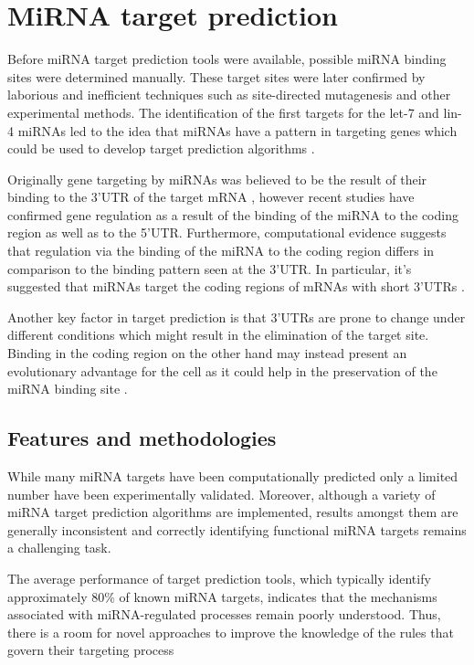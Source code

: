 \section{MiRNA target prediction}
Before miRNA target prediction tools were available, possible miRNA binding sites were
determined manually. These target sites were later confirmed by laborious and inefficient techniques such as site-directed mutagenesis and other experimental methods. The identification of the first targets for the let-7 and lin-4 miRNAs led to the idea that miRNAs have a pattern in targeting genes which could be used to develop target prediction algorithms \cite{first_predictions}.

Originally gene targeting by miRNAs was believed to be the result of their binding to the 3'UTR of the target mRNA \cite{multiple_binds}, however recent studies \cite{grosswendt} have confirmed gene regulation as a result of the binding of the miRNA to the coding region as well as to the 5'UTR. Furthermore, computational evidence suggests that regulation via the binding of the miRNA to the coding region differs in comparison to the binding pattern seen at the 3'UTR. In particular, it's suggested that miRNAs target the coding regions of mRNAs with short 3'UTRs \cite{functional_sites}.

Another key factor in target prediction is that 3'UTRs are prone to change under different conditions which might result in the elimination of the target site. Binding in the coding region on the other hand may instead present an evolutionary advantage for the cell as it could help in the preservation of the miRNA binding site \cite{mirna_targets}. 

\subsection{Features and methodologies}
While many miRNA targets have been computationally predicted only a limited number
have been experimentally validated. Moreover, although a variety of miRNA target prediction algorithms are implemented, results amongst them are generally inconsistent and correctly identifying functional miRNA targets remains a challenging task.

The average performance of target prediction tools, which typically identify approximately 80\% of known miRNA targets, indicates that the mechanisms associated with miRNA-regulated processes remain poorly understood. Thus, there is a room for novel approaches to improve the knowledge of the rules that govern their targeting process \cite{targeting_rules}

